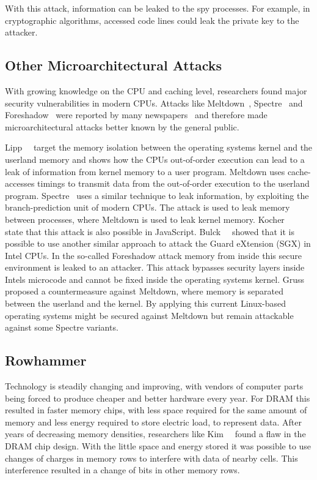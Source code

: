 With this attack, information can be leaked to the spy processes. For example,
in cryptographic algorithms, accessed code lines could leak the private key to
the attacker.

\subsection{Other Microarchitectural Attacks}

With growing knowledge on the CPU and caching level, researchers found major
security vulnerabilities in modern CPUs. Attacks like Meltdown~\cite{meltdown},
Spectre~\cite{spectre} and Foreshadow~\cite{foreshadow} were reported by many
newspapers~\cite{bbcmeltdown, nbcmeltdown} and therefore made microarchitectural
attacks better known by the general public.

Lipp~\etal~\cite{meltdown} target the memory isolation between the operating
system\textquotesingle s kernel and the userland memory and shows how the
CPU\textquotesingle s out-of-order execution can lead to a leak of information
from kernel memory to a user program. Meltdown uses cache-accesses timings to
transmit data from the out-of-order execution to the userland program.
Spectre~\cite{spectre} uses a similar technique to leak information, by
exploiting the branch-prediction unit of modern CPUs. The attack is used to leak
memory between processes, where Meltdown is used to leak kernel memory.
Kocher~\etal~\cite{spectre} state that this attack is also possible in
JavaScript. Bulck~\etal~\cite{foreshadow} showed that it is possible to use
another similar approach to attack the Guard eXtension (SGX) in Intel CPUs. In
the so-called Foreshadow attack memory from inside this secure environment is
leaked to an attacker. This attack bypasses security layers inside
Intel\textquotesingle s microcode and cannot be fixed inside the operating
system\textquotesingle s kernel. Gruss~\etal~\cite{kaiserpaper} proposed a
countermeasure against Meltdown, where memory is separated between the userland
and the kernel. By applying this current Linux-based operating systems might be
secured against Meltdown but remain attackable against some Spectre variants.

\subsection{Rowhammer}

Technology is steadily changing and improving, with vendors of computer parts
being forced to produce cheaper and better hardware every year. For DRAM this
resulted in faster memory chips, with less space required for the same amount of
memory and less energy required to store electric load, to represent data. After
years of decreasing memory densities, researchers like
Kim~\etal~\cite{rowhammergeneral} found a flaw in the DRAM chip design. With the
little space and energy stored it was possible to use changes of charges in
memory rows to interfere with data of nearby cells. This interference resulted
in a change of bits in other memory rows.

